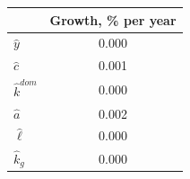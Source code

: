 \begin{tabular}{@{}lS[table-format=+1.3]@{}}
\toprule
 & {Growth, \% per year} \\
\midrule
$\hat y$ & 0.000 \\
$\hat c$ & 0.001 \\
$\hat k^{dom}$ & 0.000 \\
$\hat a$ & 0.002 \\
$\hat\ell$ & 0.000 \\
$\hat k_g$ & 0.000 \\
\bottomrule
\end{tabular}
